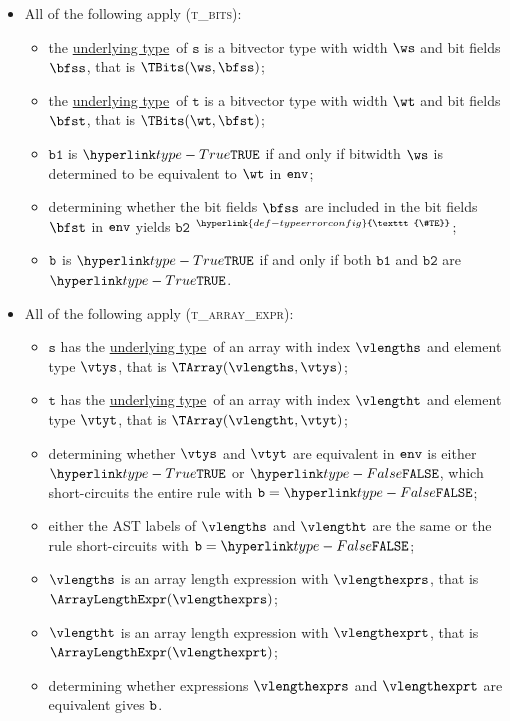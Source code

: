 \documentclass{book}
\newcommand\TypeErrorConfig[0]{\hyperlink{def-typeerrorconfig}{\texttt{\#TE}}}
\newcommand\ProseOrTypeError[0]{\hyperlink{def-proseortypeerror}{$^{\TypeErrorConfig}$}}
\newcommand\underlyingtype[0]{\hyperlink{def-underlyingtype}{underlying type}}
\newcommand\vt[0]{\texttt{t}}
\newcommand\vs[0]{\texttt{s}}
\newcommand\vbone[0]{\texttt{b1}}
\newcommand\vbtwo[0]{\texttt{b2}}
\begin{document}
\begin{itemize}
\item All of the following apply (\textsc{t\_bits}):
  \begin{itemize}
  \item the \underlyingtype\ of $\vs$ is a bitvector type with width $\ws$ and bit fields $\bfss$, that is $\TBits(\ws, \bfss)$;
  \item the \underlyingtype\ of $\vt$ is a bitvector type with width $\wt$ and bit fields $\bfst$, that is $\TBits(\wt, \bfst)$;
  \item $\vbone$ is $\True$ if and only if bitwidth $\ws$ is determined to be equivalent to $\wt$ in $\texttt{env}$;
  \item determining whether the bit fields $\bfss$ are included in the bit fields $\bfst$ in $\texttt{env}$ yields $\vbtwo$ \ProseOrTypeError;
  \item $\texttt{b}$ is $\True$ if and only if both $\vbone$ and $\vbtwo$ are $\True$.
  \end{itemize}

\item All of the following apply (\textsc{t\_array\_expr}):
  \begin{itemize}
  \item $\vs$ has the \underlyingtype\ of an array with index $\vlengths$ and element type $\vtys$, that is $\TArray(\vlengths, \vtys)$;
  \item $\vt$ has the \underlyingtype\ of an array with index $\vlengtht$ and element type $\vtyt$, that is $\TArray(\vlengtht, \vtyt)$;
  \item determining whether $\vtys$ and $\vtyt$ are equivalent in $\texttt{env}$ is either $\True$
  or $\False$, which short-circuits the entire rule with $\vb=\False$;
  \item either the AST labels of $\vlengths$ and $\vlengtht$ are the same or the rule short-circuits with $\vb=\False$;
  \item $\vlengths$ is an array length expression with $\vlengthexprs$, that is \\ $\ArrayLengthExpr(\vlengthexprs)$;
  \item $\vlengtht$ is an array length expression with $\vlengthexprt$, that is \\ $\ArrayLengthExpr(\vlengthexprt)$;
  \item determining whether expressions $\vlengthexprs$ and $\vlengthexprt$ are equivalent gives $\texttt{b}$.
  \end{itemize}


\end{itemize}
\end{document}
